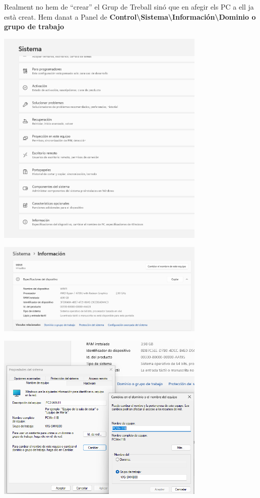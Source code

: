 \documentclass[
  a4paper,
]{article}
\begin{document}
Realment no hem de ``crear'' el Grup de Treball sinó que en afegir els
PC a ell ja està creat. Hem danat a Panel de
\textbf{Control\textbackslash Sistema\textbackslash Información\textbackslash Dominio
o grupo de trabajo}

\includegraphics[width=0.75\textwidth,height=\textheight]{png/informacionSistema1.png}

\includegraphics[width=0.75\textwidth,height=\textheight]{png/informacionSistema2.png}

\includegraphics[width=0.75\textwidth,height=\textheight]{png/workgroup1.png}
\end{document}

